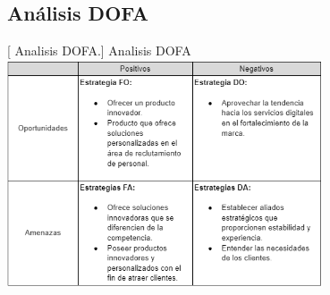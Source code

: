 \subsection{Análisis DOFA}
\begin{minipage}{0.9\textwidth}
\centering
{}[{ Analisis DOFA.}]{  Analisis DOFA }
\label{dofa}
\includegraphics[width=0.7\textwidth]{Images/analisisDOFA.png}
\end{minipage}